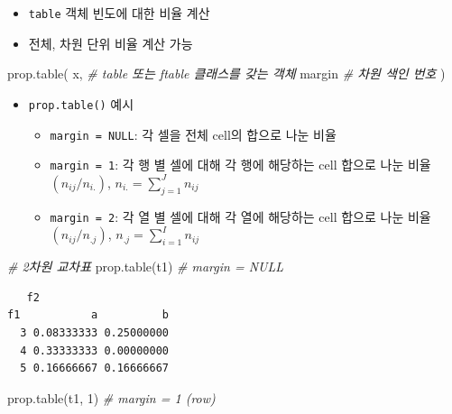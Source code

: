 \documentclass[
  11pt,
]{krantz}
\newenvironment{Shaded}{\begin{snugshade}}{\end{snugshade}}
\newcommand{\CommentTok}[1]{\textcolor[rgb]{0.37,0.37,0.37}{\textit{#1}}}
\newcommand{\DecValTok}[1]{\textcolor[rgb]{0.06,0.06,0.06}{#1}}
\newcommand{\FunctionTok}[1]{\textcolor[rgb]{0,0,0}{#1}}
\newcommand{\NormalTok}[1]{#1}
\providecommand{\tightlist}{%
  \setlength{\itemsep}{0pt}\setlength{\parskip}{0pt}}
\begin{document}
\begin{itemize}
\tightlist
\item
  \texttt{table} 객체 빈도에 대한 비율 계산
\item
  전체, 차원 단위 비율 계산 가능
\end{itemize}

\footnotesize

\begin{Shaded}
\begin{Highlighting}[]
\FunctionTok{prop.table}\NormalTok{(}
\NormalTok{  x,  }\CommentTok{\# table 또는 ftable 클래스를 갖는 객체}
\NormalTok{  margin }\CommentTok{\# 차원 색인 번호}
\NormalTok{)}
\end{Highlighting}
\end{Shaded}

\normalsize

\begin{itemize}
\tightlist
\item
  \texttt{prop.table()} 예시

  \begin{itemize}
  \tightlist
  \item
    \texttt{margin\ =\ NULL}: 각 셀을 전체 cell의 합으로 나눈 비율
  \item
    \texttt{margin\ =\ 1}: 각 행 별 셀에 대해 각 행에 해당하는 cell 합으로 나눈 비율 \((n_{ij}/n_{i.})\), \(n_{i.} = \sum_{j=1}^{J} n_{ij}\)
  \item
    \texttt{margin\ =\ 2}: 각 열 별 셀에 대해 각 열에 해당하는 cell 합으로 나눈 비율 \((n_{ij}/n_{.j})\), \(n_{.j} = \sum_{i=1}^{I} n_{ij}\)
  \end{itemize}
\end{itemize}

\footnotesize

\begin{Shaded}
\begin{Highlighting}[]
\CommentTok{\# 2차원 교차표}
\FunctionTok{prop.table}\NormalTok{(t1) }\CommentTok{\# margin = NULL}
\end{Highlighting}
\end{Shaded}

\begin{verbatim}
   f2
f1           a          b
  3 0.08333333 0.25000000
  4 0.33333333 0.00000000
  5 0.16666667 0.16666667
\end{verbatim}

\begin{Shaded}
\begin{Highlighting}[]
\FunctionTok{prop.table}\NormalTok{(t1, }\DecValTok{1}\NormalTok{) }\CommentTok{\# margin = 1 (row)}
\end{Highlighting}
\end{Shaded}
\end{document}
